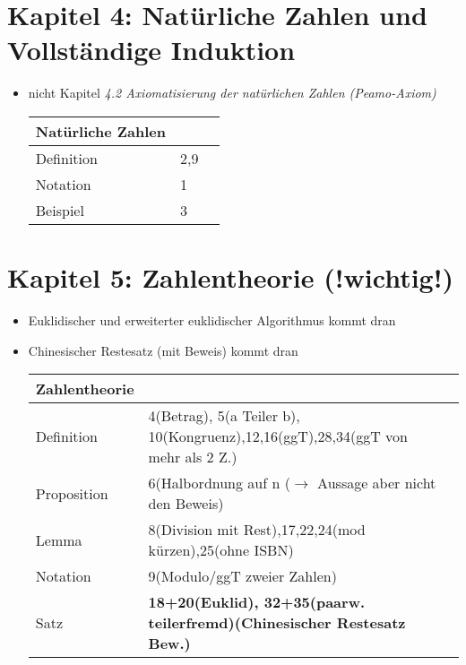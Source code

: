 \documentclass[11pt,a4paper]{article}
\begin{document}
\section*{Kapitel 4: Natürliche Zahlen und Vollständige Induktion}
\begin{itemize}
	\item nicht Kapitel \emph{4.2 Axiomatisierung der natürlichen Zahlen (Peamo-Axiom)}
	\begin{center}
		\begin{tabular}{ | l | l | l | }
			\hline
			Natürliche Zahlen& \\ \hline	\hline	
			Definition&2,9\\ \hline
			Notation& 1\\ \hline
			Beispiel& 3\\ 
			\hline	
		\end{tabular}
	\end{center}	
\end{itemize}

\newpage

\section*{Kapitel 5: Zahlentheorie (!wichtig!)}
\begin{itemize}
	\item Euklidischer und erweiterter euklidischer Algorithmus kommt dran
	\item Chinesischer Restesatz (mit Beweis) kommt dran
	\begin{center}
		\begin{tabular}{ | l | l | l | }
			\hline
			Zahlentheorie& \\ \hline	\hline	
			Definition&4(Betrag), 5(a Teiler b), 10(Kongruenz),12,16(ggT),28,34(ggT von mehr als 2 Z.)\\ \hline
			Proposition&6(Halbordnung auf n ($\rightarrow$ Aussage aber nicht den Beweis)\\ \hline
			Lemma&8(Division mit Rest),17,22,24(mod kürzen),25(ohne ISBN)\\ \hline
			Notation&9(Modulo/ggT zweier Zahlen)\\ \hline
			Satz&\textbf{18+20(Euklid), 32+35(paarw. teilerfremd)(Chinesischer Restesatz Bew.)}\\ 
			\hline	
		\end{tabular}
	\end{center}	
\end{itemize}
\end{document}

